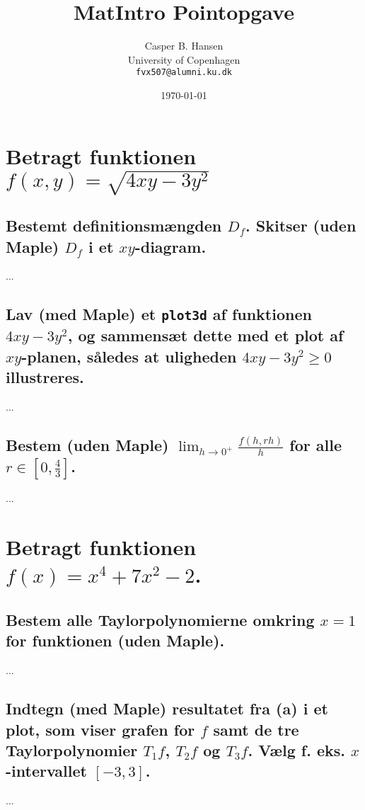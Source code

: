 \documentclass[11pt,a4paper]{article}
\title{MatIntro Pointopgave \assignmentnumber}
\author
{
    Casper B. Hansen\\
    University of Copenhagen\\
    {\tt fvx507@alumni.ku.dk}
}
\date{\today}
\newcommand{\limit}[2]{\lim_{#1 \rightarrow #2}}
\begin{document}


\section
{
    \mdseries
    Betragt funktionen $f(x,y) = \sqrt{4xy - 3y^2}$
}

\subsection
{
    \mdseries
    Bestemt definitionsmængden $D_f$. Skitser (uden Maple) $D_f$ i et
    $xy$-diagram.
}
...

\subsection
{
    \mdseries
    Lav (med Maple) et {\tt plot3d} af funktionen $4xy - 3y^2$, og sammensæt
    dette med et plot af $xy$-planen, således at uligheden $4xy - 3y^2 \geq 0$
    illustreres.
}
...

\subsection
{
    \mdseries
    Bestem (uden Maple) $\limit{h}{0^+} \frac{f(h, rh)}{h}$ for alle $r \in
    [0,\frac{4}{3}]$.
}
...


\section
{
    \mdseries
    Betragt funktionen $f(x) = x^4 + 7x^2 - 2$.
}

\subsection
{
    \mdseries
    Bestem alle Taylorpolynomierne omkring $x = 1$ for funktionen (uden
    Maple).
}
...

\subsection
{
    \mdseries
    Indtegn (med Maple) resultatet fra (a) i et plot, som viser grafen for $f$
    samt de tre Taylorpolynomier $T_1 f$, $T_2 f$ og $T_3 f$. Vælg f. eks.
    $x$-intervallet $[-3,3]$.
}
...
\end{document}

